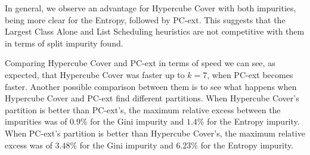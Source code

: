 
In general, we observe an advantage for Hypercube Cover with both impurities, being more clear for the Entropy, followed by PC-ext. This suggests that the Largest Class Alone and List Scheduling heuristics are not competitive with them in terms of split impurity found.

Comparing Hypercube Cover and PC-ext in terms of speed we can see, as expected, that Hypercube Cover was faster up to $k=7$, when PC-ext becomes faster.
Another possible comparison between them is to see what happens when Hypercube Cover and PC-ext find different partitions. When Hypercube Cover's partition is better than PC-ext's, the maximum relative excess between the impurities was of $0.9\%$ for the Gini impurity and $1.4 \%$ for the Entropy impurity.
When PC-ext's partition is better than Hypercube Cover's, the  maximum relative excess was of $3.48 \%$ for the Gini impurity and $6.23 \%$ for the Entropy impurity. 

